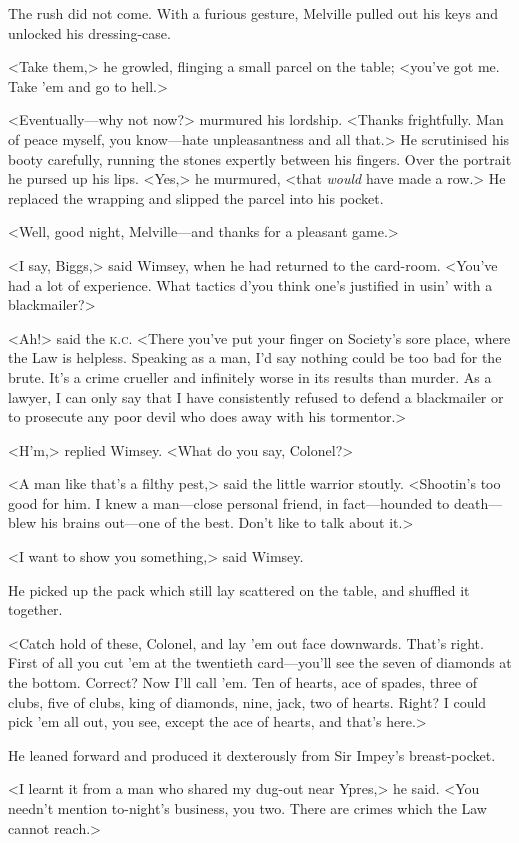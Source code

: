 The rush did not come. With a furious gesture, Melville pulled out his keys and unlocked his dressing-case.

<Take them,> he growled, flinging a small parcel on the table; <you've got me. Take 'em and go to hell.>

<Eventually—why not now?> murmured his lordship. <Thanks frightfully. Man of peace myself, you know—hate unpleasantness and all that.> He scrutinised his booty carefully, running the stones expertly between his fingers. Over the portrait he pursed up his lips. <Yes,> he murmured, <that \emph{would} have made a row.> He replaced the wrapping and slipped the parcel into his pocket.

<Well, good night, Melville—and thanks for a pleasant game.>

<I say, Biggs,> said Wimsey, when he had returned to the card-room. <You've had a lot of experience. What tactics d'you think one's justified in usin' with a blackmailer?>

<Ah!> said the \textsc{k.c.} <There you've put your finger on Society's sore place, where the Law is helpless. Speaking as a man, I'd say nothing could be too bad for the brute. It's a crime crueller and infinitely worse in its results than murder. As a lawyer, I can only say that I have consistently refused to defend a blackmailer or to prosecute any poor devil who does away with his tormentor.>

<H'm,> replied Wimsey. <What do you say, Colonel?>

<A man like that's a filthy pest,> said the little warrior stoutly. <Shootin's too good for him. I knew a man—close personal friend, in fact—hounded to death—blew his brains out—one of the best. Don't like to talk about it.>

<I want to show you something,> said Wimsey.

He picked up the pack which still lay scattered on the table, and shuffled it together.

<Catch hold of these, Colonel, and lay 'em out face downwards. That's right. First of all you cut 'em at the twentieth card—you'll see the seven of diamonds at the bottom. Correct? Now I'll call 'em. Ten of hearts, ace of spades, three of clubs, five of clubs, king of diamonds, nine, jack, two of hearts. Right? I could pick 'em all out, you see, except the ace of hearts, and that's here.>

He leaned forward and produced it dexterously from Sir Impey's breast-pocket.

<I learnt it from a man who shared my dug-out near Ypres,> he said. <You needn't mention to-night's business, you two. There are crimes which the Law cannot reach.>